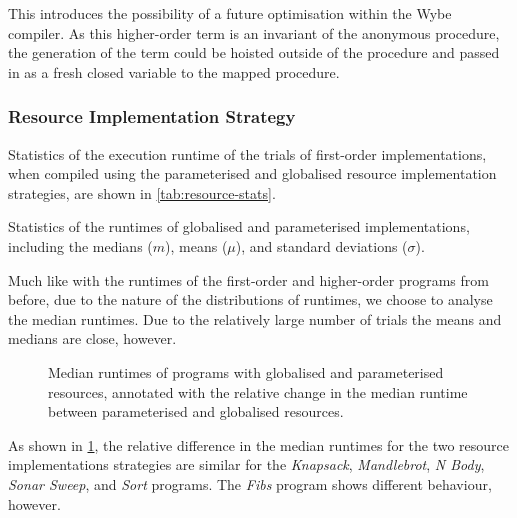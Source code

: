 This introduces the possibility of a future optimisation within the Wybe compiler. As this higher-order term is an invariant of the anonymous procedure, the generation of the term could be hoisted outside of the procedure and passed in as a fresh closed variable to the mapped procedure.

\subsubsection{Resource Implementation Strategy}

Statistics of the execution runtime of the \ntrials{} trials of first-order implementations, when compiled using the parameterised and globalised resource implementation strategies, are shown in \cref{tab:resource-stats}.

\begin{table}[ht]
  \centering
  \caption[Statistics of the runtimes of globalised and parameterised implementations.]{Statistics of the runtimes of globalised and parameterised implementations, including the medians ($m$), means ($\mu$), and standard deviations ($\sigma$).}
  \label{tab:resource-stats}
\end{table}

Much like with the runtimes of the first-order and higher-order programs from before, due to the nature of the distributions of runtimes, we choose to analyse the median runtimes. Due to the relatively large number of trials the means and medians are close, however.

\begin{figure}[ht]
  \centering
  \caption[Median runtimes of programs with globalised and parameterised resources.]{Median runtimes of programs with globalised and parameterised resources, annotated with the relative change in the median runtime between parameterised and globalised resources.}
  \label{fig:plot-resources}
\end{figure}

As shown in \cref{fig:plot-resources}, the relative difference in the median runtimes for the two resource implementations strategies are similar for the \textit{Knapsack}, \textit{Mandlebrot}, \textit{N Body}, \textit{Sonar Sweep}, and \textit{Sort} programs. The \textit{Fibs} program shows different behaviour, however.

